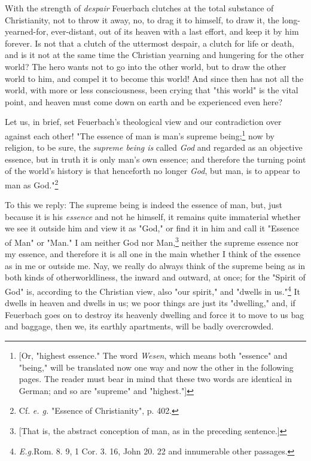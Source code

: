 With the strength of \textit{despair} Feuerbach clutches at the total 
substance of Christianity, not to throw it away, no, to drag it to himself, to 
draw it, the long-yearned-for, ever-distant, out of its heaven with a last 
effort, and keep it by him forever. Is not that a clutch of the uttermost 
despair, a clutch for life or death, and is it not at the same time the 
Christian yearning and hungering for the other world? The hero wants not to go 
into the other world, but to draw the other world to him, and compel it to 
become this world! And since then has not all the world, with more or less 
consciousness, been crying that "{}this world"{} is the vital point, and 
heaven must come down on earth and be experienced even here?

Let us, in brief, set Feuerbach's theological view and our contradiction over 
against each other! "{}The essence of man is man's supreme 
being;\footnote{[Or, "{}highest essence."{} The word \textit{Wesen}, which 
means both "{}essence"{} and "{}being,"{} will be translated now one way and 
now the other in the following pages. The reader must bear in mind that these 
two words are identical in German; and so are "{}supreme"{} and 
"{}highest."{}]} now by religion, to be sure, the \textit{supreme being is} 
called \textit{God} and regarded as an objective essence, but in truth it is 
only man's own essence; and therefore the turning point of the world's history 
is that henceforth no longer \textit{God}, but man, is to appear to man as 
God."{}\footnote{Cf. \textit{e. g.} "{}Essence of Christianity"{}, p. 402.}

To this we reply: The supreme being is indeed the essence of man, but, just 
because it is his \textit{essence} and not he himself, it remains quite 
immaterial whether we see it outside him and view it as "{}God,"{} or find it 
in him and call it "{}Essence of Man"{} or "{}Man."{} I am neither God nor 
Man,\footnote{[That is, the abstract conception of man, as in the preceding 
sentence.]} neither the supreme essence nor my essence, and therefore it is 
all one in the main whether I think of the essence as in me or outside me. 
Nay, we really do always think of the supreme being as in both kinds of 
otherworldliness, the inward and outward, at once; for the "{}Spirit of God"{} 
is, according to the Christian view, also "{}our spirit,"{} and "{}dwells in 
us."{}\footnote{\textit{E.g.}Rom. 8. 9, 1 Cor. 3. 16, John 20. 22 and 
innumerable other passages.} It dwells in heaven and dwells in us; we poor 
things are just its "{}dwelling,"{} and, if Feuerbach goes on to destroy its 
heavenly dwelling and force it to move to us bag and baggage, then we, its 
earthly apartments, will be badly overcrowded.

